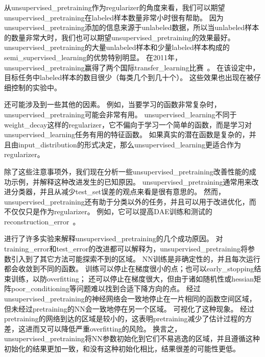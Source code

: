 从\gls{unsupervised_pretraining}作为\gls{regularizer}的角度来看，我们可以期望\gls{unsupervised_pretraining}在\gls{labeled}样本数量非常小时很有帮助。
因为\gls{unsupervised_pretraining}添加的信息来源于\gls{unlabeled}数据，所以当\gls{unlabeled}样本的数量非常大时，我们也可以期望\gls{unsupervised_pretraining}的效果最好。
\gls{unsupervised_pretraining}的大量\gls{unlabeled}样本和少量\gls{labeled}样本构成的\gls{semi_supervised_learning}的优势特别明显。
在2011年，\gls{unsupervised_pretraining}赢得了两个国际\gls{transfer_learning}比赛~\citep{UTLC+LISA-2011-small,goodfellow+all-NIPS2011}。
在该设定中，目标任务中\gls{labeled}样本的数目很少（每类几个到几十个）。
这些效果也出现在被\citet{paine2014analysis}仔细控制的实验中。%


还可能涉及到一些其他的因素。
例如，当要学习的函数非常复杂时，\gls{unsupervised_pretraining}可能会非常有用。
\gls{unsupervised_learning}不同于\gls{weight_decay}这样的\gls{regularizer}，它不偏向于学习一个简单的函数，而是学习对\gls{unsupervised_learning}任务有用的特征函数。
如果真实的潜在函数是复杂的，并且由\gls{input_distribution}的形式决定，那么\gls{unsupervised_learning}更适合作为\gls{regularizer}。


除了这些注意事项外，我们现在分析一些\gls{unsupervised_pretraining}改善性能的成功示例，并解释这种改进发生的已知原因。
\gls{unsupervised_pretraining}通常用来改进分类器，并且从减少\gls{test_set}误差的观点来看是很有意思的。
然而，\gls{unsupervised_pretraining}还有助于分类以外的任务，并且可以用于改进优化，而不仅仅只是作为\gls{regularizer}。
例如，它可以提高\gls{DAE}训练和测试的\gls{reconstruction_error}~\citep{Hinton-Science2006}。


\cite{Erhan+al-2010-small}进行了许多实验来解释\gls{unsupervised_pretraining}的几个成功原因。
对\gls{training_error}和\gls{test_error}的改进都可以解释为，\gls{unsupervised_pretraining}将参数引入到了其它方法可能探索不到的区域。
\gls{NN}训练是非确定性的，并且每次运行都会收敛到不同的函数。
训练可以停止在梯度很小的点；也可以\gls{early_stopping}结束训练，以防\gls{overfitting}；
还可以停止在梯度很大，但由于诸如随机性或\gls{hessian}矩阵\gls{poor_conditioning}等问题难以找到合适下降方向的点。
经过\gls{unsupervised_pretraining}的神经网络会一致地停止在一片相同的函数空间区域，但未经过\gls{pretraining}的\gls{NN}会一致地停在另一个区域。
可视化了这种现象。
经过\gls{pretraining}的网络到达的区域是较小的，这表明\gls{pretraining}减少了估计过程的方差，这进而又可以降低严重\gls{overfitting}的风险。
换言之，\gls{unsupervised_pretraining}将\gls{NN}参数初始化到它们不易逃逸的区域，并且遵循这种初始化的结果更加一致，和没有这种初始化相比，结果很差的可能性更低。

